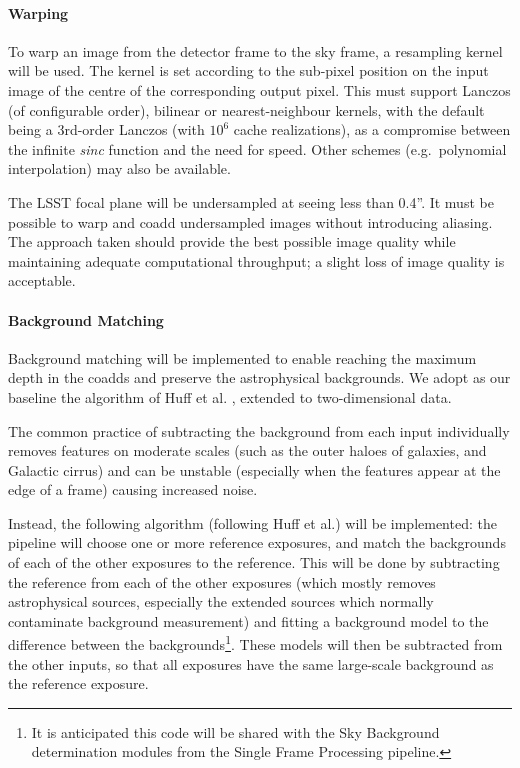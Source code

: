 \documentclass[12pt]{article}
\begin{document}
\paragraph{Warping}
\label{alg:warp}

To warp an image from the detector frame to the sky frame, a resampling kernel will be used. The kernel is set according to the sub-pixel position on the input image of the centre of the corresponding output pixel. This must support Lanczos (of configurable order), bilinear or nearest-neighbour kernels, with the default being a 3rd-order Lanczos (with $10^6$ cache realizations), as a compromise between the infinite \emph{sinc} function and the need for speed. Other schemes (e.g.\ polynomial interpolation) may also be available.

The LSST focal plane will be undersampled at seeing less than 0.4''. It must be possible to warp and coadd undersampled images without introducing aliasing. The approach taken should provide the best possible image quality while maintaining adequate computational throughput; a slight loss of image quality is acceptable.

\paragraph{Background Matching}
\label{alg:backgroundMatching}

Background matching will be implemented to enable reaching the maximum depth in the coadds and preserve the astrophysical backgrounds.  We adopt as our baseline the algorithm of Huff et al. \cite{Huff11}, extended to two-dimensional data.

The common practice of subtracting the background from each input individually removes features on moderate scales (such as the outer haloes of galaxies, and Galactic cirrus) and can be unstable (especially when the features appear at the edge of a frame) causing increased noise.

Instead, the following algorithm (following Huff et al.) will be implemented: the pipeline will choose one or more reference exposures, and match the backgrounds of each of the other exposures to the reference.  This will be done by subtracting the reference from each of the other exposures (which mostly removes astrophysical sources, especially the extended sources which normally contaminate background measurement) and fitting a background model to the difference between the backgrounds\footnote{It is anticipated this code will be shared with the Sky Background determination modules from the Single Frame Processing pipeline.}. These models will then be subtracted from the other inputs, so that all exposures have the same large-scale background as the reference exposure. 
\end{document}
